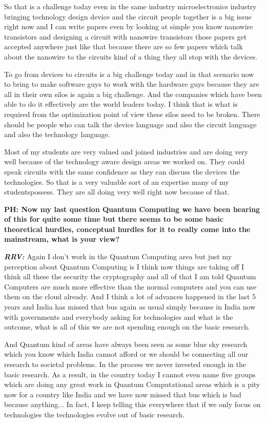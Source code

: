 \begin{multicols}{2}
So that is a challenge today even in the same industry microelectronics industry bringing technology design device and the circuit people together is a big issue right now and I can write papers even by looking at simple you know nanowire transistors and designing a circuit with nanowire transistors those papers get accepted anywhere just like that because there are so few papers which talk about the nanowire to the circuits kind of a thing they all stop with the devices.

To go from devices to circuits is a big challenge today and in that scenario now to bring to make software guys to work with the hardware guys because they are all in their own silos is again a big challenge. And the companies which have been able to do it effectively are the world leaders today. I think that is what is required from the optimization point of view these silos need to be broken. There should be people who can talk the device language and also the circuit language and also the technology language.

Most of my students are very valued and joined industries and are doing very well because of the technology aware design areas we worked on. They could speak circuits with the same confidence as they can discuss the devices the technologies. So that is a very valuable sort of an expertise many of my studentspossess. They are all doing very well right now because of that.

\textbf{PH: Now my last question Quantum Computing we have been hearing of this for quite some time but there seems to be some basic theoretical hurdles, conceptual hurdles for it to really come into the mainstream, what is your view?}

\textbf{\textit{RRV:}} Again I don’t work in the Quantum Computing area but just my perception about Quantum Computing is I think now things are taking off I think all these the security the cryptography and all of that I am told Quantum Computers are much more effective than the normal computers and you can use them on the cloud already. And I think a lot of advances happened in the last 5 years and India has missed that bus again as usual simply because in India now with governments and everybody asking for technologies and what is the outcome, what is all of this we are not spending enough on the basic research.

And Quantum kind of areas have always been seen as some blue sky research which you know which India cannot afford or we should be connecting all our research to societal problems. In the process we never invested enough in the basic research. As a result, in the country today I cannot even name five groups which are doing any great work in Quantum Computational areas which is a pity now for a country like India and we have now missed that bus which is bad because anything... In fact, I keep telling this everywhere that if we only focus on technologies the technologies evolve out of basic research.


\end{multicols}
